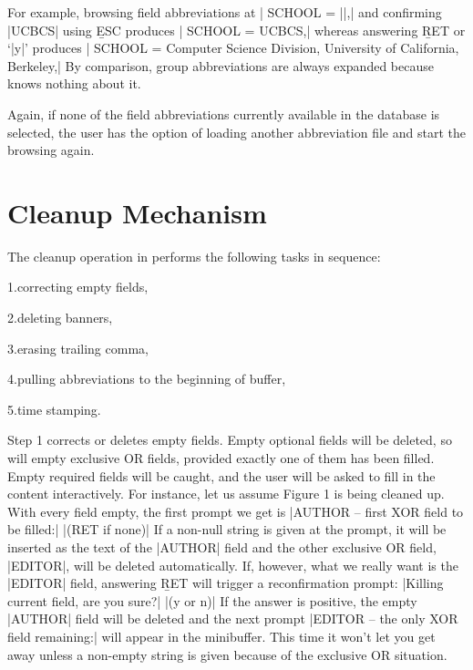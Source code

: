 \noindent
For example, browsing field abbreviations at
\begindisplay
|    SCHOOL = {|\block|},|\cr
\enddisplay
and confirming |UCBCS| using {\b ESC} produces
\begindisplay
|    SCHOOL = UCBCS,|\cr
\enddisplay
whereas answering {\b RET} or `|y|' produces
\begindisplay
|    SCHOOL = {Computer Science Division, University of California, Berkeley},|\cr
\enddisplay
By comparison, group abbreviations are always expanded
because {\BibTeX} knows nothing about it.

Again, if none of the field abbreviations currently available
in the database is selected, the user has the option of
loading another abbreviation file and start the browsing again.

\chapter{Cleanup Mechanism}

\noindent
The cleanup operation in {\BM} performs the following tasks in sequence:
\item{1.}{correcting empty fields,}
\item{2.}{deleting banners,}
\item{3.}{erasing trailing comma,}
\item{4.}{pulling abbreviations to the beginning of buffer,}
\item{5.}{time stamping.}  

Step 1 corrects or deletes empty fields.  Empty optional fields will 
be deleted, so will empty exclusive OR fields, provided exactly one
of them has been filled.  Empty required fields will be caught,
and the user will be asked to fill in the content interactively.
For instance, let us assume Figure 1 is being cleaned up.
With every field empty, the first prompt we get is
\begindisplay
|AUTHOR -- first XOR field to be filled:| |(RET if none)| \block\cr
\enddisplay
If a non-null string is given at the prompt, it will be inserted as
the text of the |AUTHOR| field and the other exclusive OR field, |EDITOR|,
will be deleted automatically.  If, however, what we really want is the
|EDITOR| field, answering {\b RET} will trigger a reconfirmation prompt:
\begindisplay
|Killing current field, are you sure?| |(y or n)|\cr
\enddisplay
If the answer is positive, the empty |AUTHOR| field will be deleted and the
next prompt
\begindisplay
|EDITOR -- the only XOR field remaining:| \block\cr
\enddisplay
will appear in the minibuffer.
This time it won't let you get away unless a non-empty string
is given because of the exclusive OR situation.

